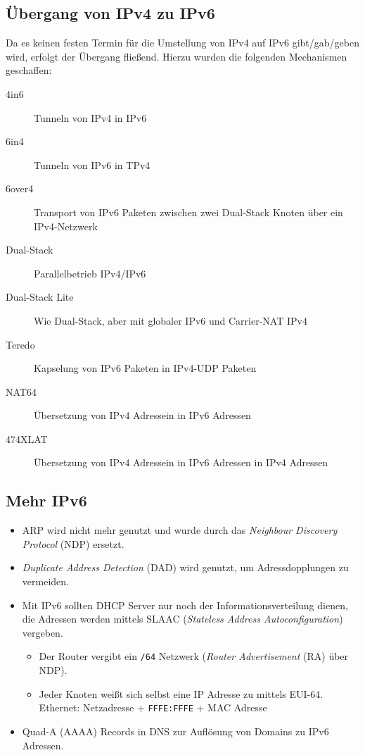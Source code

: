 		\subsection{Übergang von IPv4 zu IPv6}
			Da es keinen festen Termin für die Umstellung von IPv4 auf IPv6 gibt/gab/geben wird, erfolgt der Übergang fließend. Hierzu wurden die folgenden Mechanismen geschaffen:
			\begin{description}
				\item[4in6] Tunneln von IPv4 in IPv6
				\item[6in4] Tunneln von IPv6 in TPv4
				\item[6over4] Transport von IPv6 Paketen zwischen zwei Dual-Stack Knoten über ein IPv4-Netzwerk
				\item[Dual-Stack] Parallelbetrieb IPv4/IPv6
				\item[Dual-Stack Lite] Wie Dual-Stack, aber mit globaler IPv6 und Carrier-NAT IPv4
				\item[Teredo] Kapselung von IPv6 Paketen in IPv4-UDP Paketen
				\item[NAT64] Übersetzung von IPv4 Adressein in IPv6 Adressen
				\item[474XLAT] Übersetzung von IPv4 Adressein in IPv6 Adressen in IPv4 Adressen
			\end{description}

		\subsection{Mehr IPv6} %
			\begin{itemize}
				\item ARP wird nicht mehr genutzt und wurde durch das \textit{Neighbour Discovery Protocol} (NDP) ersetzt.
				\item \textit{Duplicate Address Detection} (DAD) wird genutzt, um Adressdopplungen zu vermeiden.
				\item Mit IPv6 sollten DHCP Server nur noch der Informationsverteilung dienen, die Adressen werden mittels SLAAC (\textit{Stateless Address Autoconfiguration}) vergeben.
					\begin{itemize}
						\item Der Router vergibt ein \texttt{/64} Netzwerk (\textit{Router Advertisement} (RA) über NDP).
						\item Jeder Knoten weißt sich selbst eine IP Adresse zu mittels EUI-64. \\ Ethernet: Netzadresse + \texttt{FFFE:FFFE} + MAC Adresse
					\end{itemize}
				\item Quad-A (AAAA) Records in DNS zur Auflösung von Domains zu IPv6 Adressen.
			\end{itemize}

